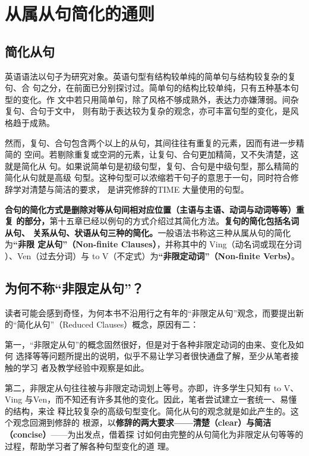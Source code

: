 
\chapter{从属从句简化的通则}

\section{简化从句}

英语语法以句子为研究对象。英语句型有结构较单纯的简单句与结构较复杂的复句、合
句之分，在前面已分别探讨过。简单句的结构比较单纯，只有五种基本句型的变化。作
文中若只用简单句，除了风格不够成熟外，表达力亦嫌薄弱。间杂复句、合句于文中，
则有助于表达较为复杂的观念，亦可丰富句型的变化，是风格趋于成熟。

然而，复句、合句包含两个以上的从句，其间往往有重复的元素，因而有进一步精简的
空间。若剔除重复或空洞的元素，让复句、合句更加精简，又不失清楚，这就是简化从
句。如果说简单句是初级句型，复句、合句是中级句型，那么精简的简化从句就是高级
句型。这种句型可以浓缩若干句子的意思于一句，同时符合修辞学对清楚与简洁的要求，
是讲究修辞的TIME 大量使用的句型。

\textbf{合句的简化方式是删除对等从句间相对应位置（主语与主语、动词与动词等等）重复
  的部分，}第十五章已经以例句的方式介绍过其简化方法。\textbf{复句的简化包括名词从句、
  关系从句、状语从句三种的简化。}一般语法书称这三种从属从句的简化为\textbf{“非限
  定从句”（Non-finite Clauses）}，并称其中的 Ving（动名词或现在分词
）、Ven（过去分词）与 to V（不定式）为\textbf{“非限定动词”（Non-finite Verbs）}。


\section{为何不称“非限定从句”？}

读者可能会感到奇怪，为何本书不沿用行之有年的“非限定从句”观念，而要提出新
的“简化从句”（Reduced Clauses）概念，原因有二：

第一，“非限定从句”的概念固然很好，但是对于各种非限定动词的由来、变化及如何
选择等等问题所提出的说明，似乎不易让学习者很快通盘了解，至少从笔者接触的学习
者及教学经验中观察是如此。

第二，非限定从句往往被与非限定动词划上等号。亦即，许多学生只知有 to V、Ving
与Ven，而不知还有许多其他的变化。因此，笔者尝试建立一套统一、易懂的结构，来诠
释比较复杂的高级句型变化。简化从句的观念就是如此产生的。这个观念回溯到修辞的
根源，以\textbf{修辞的两大要求——清楚（clear）与简洁（concise）}——为出发点，借着探
讨如何由完整的从句简化为非限定从句等等的过程，帮助学习者了解各种句型变化的道
理。

